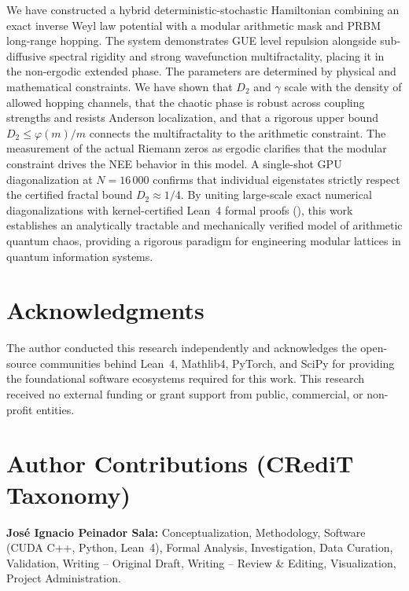 \documentclass[11pt,a4paper]{article}
\begin{document}
We have constructed a hybrid deterministic-stochastic Hamiltonian combining an exact inverse Weyl law potential with a modular arithmetic mask and PRBM long-range hopping. The system demonstrates GUE level repulsion alongside sub-diffusive spectral rigidity and strong wavefunction multifractality, placing it in the non-ergodic extended phase. The parameters are determined by physical and mathematical constraints. We have shown that $D_2$ and $\gamma$ scale with the density of allowed hopping channels, that the chaotic phase is robust across coupling strengths and resists Anderson localization, and that a rigorous upper bound $D_2 \le \varphi(m)/m$ connects the multifractality to the arithmetic constraint. The measurement of the actual Riemann zeros as ergodic clarifies that the modular constraint drives the NEE behavior in this model. A single-shot GPU diagonalization at $N=16\,000$ confirms that individual eigenstates strictly respect the certified fractal bound $D_2 \approx 1/4$. By uniting large-scale exact numerical diagonalizations with kernel-certified Lean~4 formal proofs (), this work establishes an analytically tractable and mechanically verified model of arithmetic quantum chaos, providing a rigorous paradigm for engineering modular lattices in quantum information systems.




\section*{Acknowledgments}
The author conducted this research independently and acknowledges the open-source communities behind Lean~4, Mathlib4, PyTorch, and SciPy for providing the foundational software ecosystems required for this work. This research received no external funding or grant support from public, commercial, or non-profit entities.

\section*{Author Contributions (CRediT Taxonomy)}
\textbf{José Ignacio Peinador Sala:} Conceptualization, Methodology, Software (CUDA C++, Python, Lean~4), Formal Analysis, Investigation, Data Curation, Validation, Writing -- Original Draft, Writing -- Review \& Editing, Visualization, Project Administration.
\end{document}
